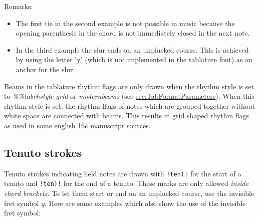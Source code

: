 \documentclass[a4paper]{article}
\begin{document}
Remarks:
\begin{itemize}
\item The first tie in the second example is not possible in music 
    because the opening parenthesis in the chord is not immediately 
    closed in the next note.
\item In the third example the slur ends on an unplucked course.
    This is achieved by using the letter 'y' (which is not implemented in the
    tablature font) as an anchor for the slur.
\end{itemize}
Beams in the tablature rhythm flags are only drawn when the
rhythm style is set to {\it \%\%tabrhstyle grid} or {\it modernbeams} (see 
\hyperref{Format parameters}{section }{}{sec:TabFormatParameters}).
When this rhythm style is set, the rhythm flags of notes which are
grouped together without white space are connected with beams.
This results in grid shaped rhythm flags as used in some english
16c manuscript sources.

\subsection{Tenuto strokes}
Tenuto strokes indicating held notes are drawn with \verb$!ten(!$ 
for the start of a tenuto and \verb$!ten)!$ for the end of a tenuto.
These marks are only allowed {\em inside chord brackets}. To let them start
or end on an unplucked course, use the invisible fret symbol {\em y}.
Here are some examples which also show the use of the invisible fret symbol:
\end{document}
